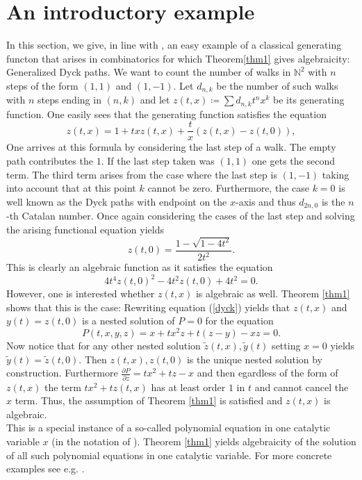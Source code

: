 \documentclass[10pt, a4paper]{article}
\theoremstyle{remark}
\theoremstyle{remark}
\begin{document}
\section{An introductory example}
In this section, we give, in line with \cite{bousquetmélou2005polynomialequationscatalyticvariable}, an easy example of a classical generating functon that arises in combinatorics for which Theorem\ref{thm1} gives algebraicity: Generalized Dyck paths. We want to count the number of walks in $\mathbb{N}^2$ with $n$ steps of the form $(1,1)$ and $(1,-1)$. Let $d_{n,k}$  be the number of such walks with $n$ steps ending in $(n,k)$ and let $z(t,x)\coloneqq\sum d_{n,k} t^n x^k$ be its generating function. One easily sees that the generating function satisfies the equation
\begin{equation}\label{dyck}   
z(t,x)=1+txz(t,x)+\frac{t}{x}\left(z(t,x)-z(t,0)\right),\end{equation}
One arrives at this formula by considering the last step of a walk. The empty path contributes the $1$. If the last step taken was $(1,1)$ one gets the second term. The third term arises from the case where the last step is $(1,-1)$ taking into account that at this point $k$ cannot be zero. Furthermore, the case $k=0$ is well known as the Dyck paths with endpoint on the $x$-axis and thus $d_{2n,0}$ is the $n$-th Catalan number. Once again considering the cases of the last step and solving the arising functional equation yields $$z(t,0)=\frac{1-\sqrt{1-4t^2}}{2t^2}.$$ This is clearly an algebraic function as it satisfies the equation
$$4t^4z(t,0)^2-4t^2z(t,0)+4t^2=0.$$ However, one is interested whether $z(t,x)$ is algebraic as well. Theorem \ref{thm1} shows that this is the case: Rewriting equation (\ref{dyck}) yields that $z(t,x)$ and $y(t)=z(t,0)$ is a nested solution of $P=0$ for the equation $$P(t,x,y,z)=x+tx^2z+t(z-y)-xz=0.$$ Now notice that for any other nested solution $\widetilde{z}(t,x),\widetilde{y}(t)$ setting $x=0$ yields $\widetilde{y}(t)=\widetilde{z}(t,0)$. Then $z(t,x),z(t,0)$ is the unique nested solution by construction. Furthermore $\frac{\partial P}{\partial z}=tx^2+tz-x$ and then egardless of the form of $z(t,x)$ the term $tx^2+tz(t,x)$ has at least order $1$ in $t$ and cannot cancel the $x$ term. Thus, the assumption of Theorem \ref{thm1} is satisfied and $z(t,x)$ is algebraic. 
\\This is a special instance of a so-called polynomial equation in one catalytic variable $x$ (in the notation of \cite{ZEILBERGER2000451}). Theorem \ref{thm1} yields algebraicity of the solution of all such polynomial equations in one catalytic variable. For more concrete examples see e.g. \cite{bousquetmélou2005polynomialequationscatalyticvariable}.
\end{document}
